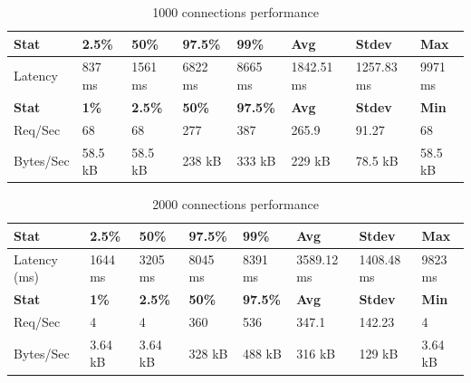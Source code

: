 \documentclass[../Main.tex]{subfiles}
\begin{document}
\begin{table}[H]
  \centering
  \begin{tabular}{|l|l|l|l|l|l|l|l|}
\hline
\rowcolor[HTML]{f56b00}
\textbf{Stat} & \textbf{2.5\%} & \textbf{50\%} & \textbf{97.5\%} & \textbf{99\%} & \textbf{Avg} & \textbf{Stdev} & \textbf{Max} \\
\hline
Latency & 837 ms & 1561 ms & 6822 ms & 8665 ms & 1842.51 ms & 1257.83 ms & 9971 ms \\
\hline
\rowcolor[HTML]{f56b00}
\textbf{Stat} & \textbf{1\%} & \textbf{2.5\%} & \textbf{50\%} & \textbf{97.5\%} & \textbf{Avg} & \textbf{Stdev} & \textbf{Min} \\
\hline
Req/Sec & 68 & 68 & 277 & 387 & 265.9 & 91.27 & 68 \\
Bytes/Sec & 58.5 kB & 58.5 kB & 238 kB & 333 kB & 229 kB & 78.5 kB & 58.5 kB \\
\hline
\end{tabular}
 \caption{1000 connections performance}
 \label{1000-connections-performance}
\end{table}

\begin{table}[H]
\centering
\begin{tabular}{|l|l|l|l|l|l|l|l|}
\hline
\rowcolor[HTML]{f56b00}
\textbf{Stat} & \textbf{2.5\%} & \textbf{50\%} & \textbf{97.5\%} & \textbf{99\%} & \textbf{Avg} & \textbf{Stdev} & \textbf{Max} \\ \hline
Latency (ms) & 1644 ms & 3205 ms & 8045 ms & 8391 ms & 3589.12 ms & 1408.48 ms & 9823 ms \\ \hline
\rowcolor[HTML]{f56b00}
\textbf{Stat} & \textbf{1\%} & \textbf{2.5\%} & \textbf{50\%} & \textbf{97.5\%} & \textbf{Avg} & \textbf{Stdev} & \textbf{Min} \\ \hline
Req/Sec & 4 & 4 & 360 & 536 & 347.1 & 142.23 & 4 \\ \hline
Bytes/Sec & 3.64 kB & 3.64 kB & 328 kB & 488 kB & 316 kB & 129 kB & 3.64 kB \\ \hline
\end{tabular}
 \caption{2000 connections performance}
 \label{2000-connections-performance}
\end{table}
\end{document}
